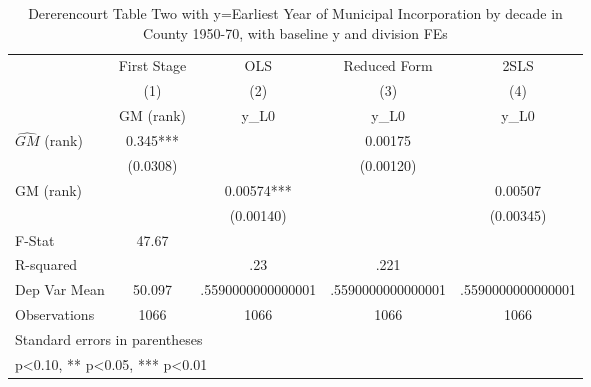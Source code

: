 \begin{table}[htbp]\centering
\def\sym#1{\ifmmode^{#1}\else\(^{#1}\)\fi}
\caption{Dererencourt Table Two with y=Earliest Year of Municipal Incorporation by decade in County 1950-70, with baseline y and division FEs}
\begin{tabular}{l*{4}{c}}
\toprule
                    & First Stage   &         OLS   &Reduced Form   &        2SLS   \\
                    &\multicolumn{1}{c}{(1)}&\multicolumn{1}{c}{(2)}&\multicolumn{1}{c}{(3)}&\multicolumn{1}{c}{(4)}\\
                    &\multicolumn{1}{c}{GM  (rank)}&\multicolumn{1}{c}{y\_L0}&\multicolumn{1}{c}{y\_L0}&\multicolumn{1}{c}{y\_L0}\\
\midrule
$\hat{GM}$ (rank)   &       0.345***&               &     0.00175   &               \\
                    &    (0.0308)   &               &   (0.00120)   &               \\
\addlinespace
GM  (rank)          &               &     0.00574***&               &     0.00507   \\
                    &               &   (0.00140)   &               &   (0.00345)   \\
\midrule
F-Stat              &       47.67   &               &               &               \\
R-squared           &               &         .23   &        .221   &               \\
Dep Var Mean        &      50.097   &.5590000000000001   &.5590000000000001   &.5590000000000001   \\
Observations        &        1066   &        1066   &        1066   &        1066   \\
\bottomrule
\multicolumn{5}{l}{\footnotesize Standard errors in parentheses}\\
\multicolumn{5}{l}{\footnotesize * p<0.10, ** p<0.05, *** p<0.01}\\
\end{tabular}
\end{table}
